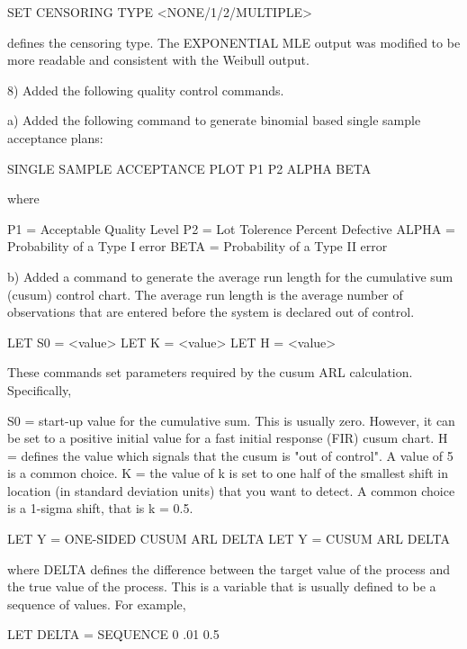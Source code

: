 {       SET CENSORING TYPE <NONE/1/2/MULTIPLE>

    defines the censoring type.  The EXPONENTIAL MLE output was
    modified to be more readable and consistent with the Weibull
    output.

 8) Added the following quality control commands.

    a) Added the following command to generate binomial based single
       sample acceptance plans:

           SINGLE SAMPLE ACCEPTANCE PLOT P1 P2 ALPHA BETA

      where

           P1 = Acceptable Quality Level
           P2 = Lot Tolerence Percent Defective
           ALPHA = Probability of a Type I error
           BETA =  Probability of a Type II error

    b) Added a command to generate the average run length for the
       cumulative sum (cusum) control chart.  The average run length
       is the average number of observations that are entered
       before the system is declared out of control.

           LET S0 = <value>
           LET K = <value>
           LET H = <value>

       These commands set parameters required by the cusum ARL
       calculation.  Specifically,

           S0     = start-up value for the cumulative sum.  This is
                    usually zero.  However, it can be set to a
                    positive initial value for a fast initial
                    response (FIR) cusum chart.
           H      = defines the value which signals that the cusum
                    is "out of control".  A value of 5 is a common
                    choice.
           K      = the value of k is set to one half of the smallest
                    shift in location (in standard deviation units)
                    that you want to detect.  A common choice is a
                    1-sigma shift, that is k = 0.5.

           LET Y = ONE-SIDED CUSUM ARL DELTA
           LET Y = CUSUM ARL DELTA

       where DELTA defines the difference between the target value
       of the process and the true value of the process.  This is
       a variable that is usually defined to be a sequence of values.
       For example, 

           LET DELTA = SEQUENCE 0 .01 0.5

}
